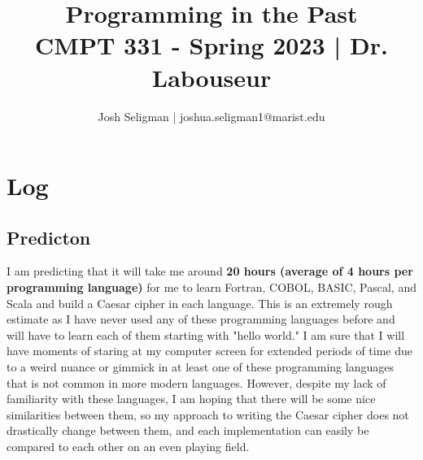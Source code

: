 \documentclass[letterpaper, 10pt, DIV=13]{scrartcl}
\title {
	\normalfont
	\huge{Programming in the Past} \\
	\vspace{10pt}
	\large{CMPT 331 - Spring 2023 | Dr. Labouseur}
}
\author{\normalfont Josh Seligman | joshua.seligman1@marist.edu}
\numberwithin{equation}{section}
\numberwithin{figure}{section}
\numberwithin{table}{section}
\begin{document}
\maketitle

\section{Log}
\subsection{Predicton}
I am predicting that it will take me around \textbf{20 hours (average of 4 hours per programming language)} for me to learn Fortran, COBOL, BASIC, Pascal, and Scala and build a Caesar cipher in each language. This is an extremely rough estimate as I have never used any of these programming languages before and will have to learn each of them starting with "hello world." I am sure that I will have moments of staring at my computer screen for extended periods of time due to a weird nuance or gimmick in at least one of these programming languages that is not common in more modern languages. However, despite my lack of familiarity with these languages, I am hoping that there will be some nice similarities between them, so my approach to writing the Caesar cipher does not drastically change between them, and each implementation can easily be compared to each other on an even playing field.
\end{document}
